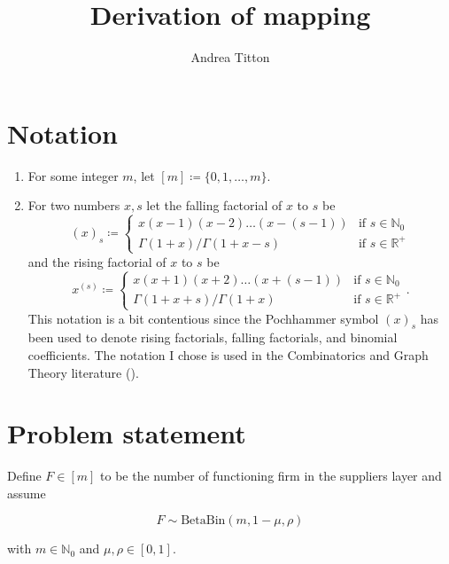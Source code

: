 \documentclass[american, abstract=on]{scrartcl}
\author{Andrea Titton}
\title{Derivation of mapping}
\theoremstyle{plain}
\renewcommand{\Re}{\mathbb{R}}
\newcommand{\Beta}{\text{Beta}}
\newcommand{\Bin}{\text{Bin}}
\begin{document}
\maketitle

\section{Notation}

\begin{enumerate}
    \item For some integer $m$, let $[m] \coloneqq \{0, 1, \ldots, m\}$.
    \item For two numbers $x, s$ let the falling factorial of $x$ to $s$ be \begin{equation}
        (x)_s \coloneqq \begin{cases} x(x - 1)(x - 2)\ldots(x - (s - 1)) & \text{if } s \in \mathbb{N}_0 \\
       \Gamma(1 + x) \Big/ \Gamma(1 + x - s)& \text{if } s \in \Re^{+}
        \end{cases}
    \end{equation} and the rising factorial of $x$ to $s$ be \begin{equation}
        x^{(s)} \coloneqq \begin{cases} x(x + 1)(x + 2)\ldots(x + (s - 1)) & \text{if } s \in \mathbb{N}_0 \\
            \Gamma(1 + x + s) \Big/ \Gamma(1 + x)& \text{if } s \in \Re^{+}
             \end{cases}.
    \end{equation} This notation is a bit contentious since the Pochhammer symbol $(x)_s$ has been used to denote rising factorials, falling factorials, and binomial coefficients. The notation I chose is used in the Combinatorics and Graph Theory literature (\cite{harris_combinatorics_2008}).
\end{enumerate}

\section{Problem statement}

Define $F \in [m]$ to be the number of functioning firm in the suppliers layer and assume 

\begin{equation}
    F \sim \Beta\Bin(m, 1 - \mu, \rho)
\end{equation}

with $m \in \mathbb{N}_0$ and $\mu, \rho \in [0, 1]$.
\end{document}
